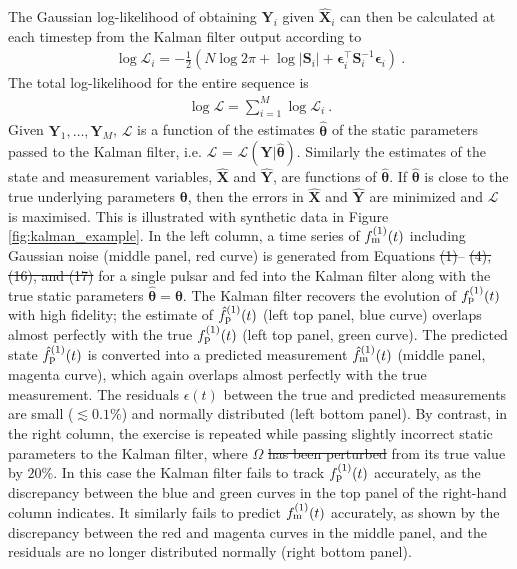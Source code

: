 \documentclass[fleqn,usenatbib,useAMS]{mnras}
\providecommand{\DIFadd}[1]{{\protect\color{blue}\uwave{#1}}} %
\providecommand{\DIFdel}[1]{{\protect\color{red}\sout{#1}}}                      %
\providecommand{\DIFaddbegin}{} %
\providecommand{\DIFaddend}{} %
\providecommand{\DIFdelbegin}{} %
\providecommand{\DIFdelend}{} %
\newcommand{\DIFscaledelfig}{0.5}
\newlength{\DIFdelgraphicswidth} %
\newlength{\DIFdelgraphicsheight} %
\newcommand{\DIFaddincludegraphics}[2][]{{\color{blue}\fbox{\DIFOincludegraphics[#1]{#2}}}} %
\newcommand{\DIFdelincludegraphics}[2][]{%
\sbox{\DIFdelgraphicsbox}{\DIFOincludegraphics[#1]{#2}}%
\settoboxwidth{\DIFdelgraphicswidth}{\DIFdelgraphicsbox} %
\settoboxtotalheight{\DIFdelgraphicsheight}{\DIFdelgraphicsbox} %
\scalebox{\DIFscaledelfig}{%
\parbox[b]{\DIFdelgraphicswidth}{\usebox{\DIFdelgraphicsbox}\\[-\baselineskip] \rule{\DIFdelgraphicswidth}{0em}}\llap{\resizebox{\DIFdelgraphicswidth}{\DIFdelgraphicsheight}{%
\setlength{\unitlength}{\DIFdelgraphicswidth}%
\begin{picture}(1,1)%
\thicklines\linethickness{2pt} %
{\color[rgb]{1,0,0}\put(0,0){\framebox(1,1){}}}%
{\color[rgb]{1,0,0}\put(0,0){\line( 1,1){1}}}%
{\color[rgb]{1,0,0}\put(0,1){\line(1,-1){1}}}%
\end{picture}%
}\hspace*{3pt}}} %
} %
\DeclareRobustCommand{\DIFaddbegin}{\DIFOaddbegin \let\includegraphics\DIFaddincludegraphics} %
\DeclareRobustCommand{\DIFaddend}{\DIFOaddend \let\includegraphics\DIFOincludegraphics} %
\DeclareRobustCommand{\DIFdelbegin}{\DIFOdelbegin \let\includegraphics\DIFdelincludegraphics} %
\DeclareRobustCommand{\DIFdelend}{\DIFOaddend \let\includegraphics\DIFOincludegraphics} %
\begin{document}
The Gaussian log-likelihood of obtaining ${\boldsymbol{Y}}_i$ given ${\boldsymbol{\hat X}}_i$ can  then be calculated at each timestep from the Kalman filter output according to
\begin{eqnarray}
	\log \mathcal{L}_i =  -\frac{1}{2} \left (N \log 2 \pi + \log  \left | \boldsymbol{S}_i \right | + \boldsymbol{\epsilon}_i^{\intercal} \boldsymbol{S}_i^{-1}  \boldsymbol{\epsilon}_i \right ) \ .
\end{eqnarray}
The total log-likelihood for the entire sequence is
\begin{eqnarray}
	\log \mathcal{L} =  \sum_{i=1}^{M} \log \mathcal{L}_i \ . \label{eq:likelihood}
\end{eqnarray}
Given ${\boldsymbol{Y}}_1, \dots, {\boldsymbol{Y}}_M$, $\mathcal{L}$ is a function of the estimates ${\boldsymbol{\hat \theta}}$ of the static parameters passed to the Kalman filter, i.e. $\mathcal{L}$ = $\mathcal{L}(\boldsymbol{Y} | \boldsymbol{\hat \theta})$. Similarly the estimates of the state and measurement variables, $\hat{\boldsymbol{X}}$ and $\hat{\boldsymbol{Y}}$, are functions of $\boldsymbol{\hat \theta}$. If $\boldsymbol{\hat{\theta}}$ is close to the true underlying parameters $\boldsymbol{\theta}$, then the errors in $\hat{\boldsymbol{X}}$ and $\hat{\boldsymbol{Y}}$ are minimized and $\mathcal{L}$ is maximised. This is illustrated with synthetic data in Figure \ref{fig:kalman_example}. In the left column, a time series of $f_{\rm m}^{(1)}(t)$ including Gaussian noise (middle panel, red curve) is generated from Equations \DIFdelbegin \DIFdel{(1)}\DIFdelend \DIFaddbegin \DIFadd{\eqref{eq:spinevol}}\DIFaddend -- \DIFdelbegin \DIFdel{(4), (16), and (17) }\DIFdelend \DIFaddbegin \DIFadd{\eqref{eq:xieqn}, \eqref{eq:measurement}, and \eqref{eq:g_func} }\DIFaddend for a single pulsar and fed into the Kalman filter along with the true static parameters ${\boldsymbol{\hat \theta}} = {\boldsymbol{\theta}}$. The Kalman filter recovers the evolution of $f_{\rm p}^{(1)}(t)$ with high fidelity; the estimate of $\hat{f}_{\rm p}^{(1)}(t)$ (left top panel, blue curve) overlaps almost perfectly with the true $f_{\rm p}^{(1)}(t)$ (left top panel, green curve). The predicted state $\hat{f}_{\rm p}^{(1)}(t)$ is converted  into a predicted measurement $\hat{f}_{\rm m}^{(1)}(t)$ (middle panel, magenta curve), which again overlaps almost perfectly with the true measurement. The residuals $\epsilon(t)$ between the true and predicted measurements are small ($\lesssim 0.1\%$) and normally distributed (left bottom panel). By contrast, in the right column, the exercise is repeated while passing slightly incorrect static parameters \DIFaddbegin \DIFadd{(${\boldsymbol{\hat\theta}} \neq {\boldsymbol{\theta}}$) }\DIFaddend to the Kalman filter, where $\Omega$ \DIFdelbegin \DIFdel{has been perturbed }\DIFdelend \DIFaddbegin \DIFadd{is displaced }\DIFaddend from its true value by $20 \%$. In this case the Kalman filter fails to track $f_{\rm p}^{(1)}(t)$ accurately, as the discrepancy between the blue and green curves in the top panel of the right-hand column indicates. It similarly fails to predict $f_{\rm m}^{(1)}(t)$ accurately, as shown by the discrepancy between the red and magenta curves in the middle panel, and the residuals are no longer distributed normally (right bottom panel).
\end{document}
